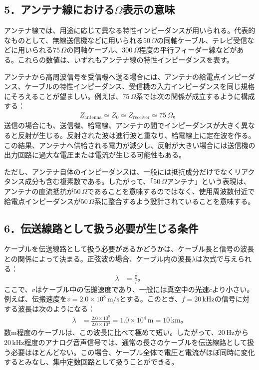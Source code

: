 \documentclass[platex,dvipdfmx,a4paper]{jsarticle}
\begin{document}
\subsection*{5．アンテナ線における$\Omega$表示の意味}

アンテナ線では、用途に応じて異なる特性インピーダンスが用いられる。代表的なものとして、無線送信機などに用いられる$50\,\Omega$の同軸ケーブル、テレビ受信などに用いられる$75\,\Omega$の同軸ケーブル、$300\,\Omega$程度の平行フィーダー線などがある。これらの数値は、いずれもアンテナ線の特性インピーダンスを表す。

アンテナから高周波信号を受信機へ送る場合には、アンテナの給電点インピーダンス、ケーブルの特性インピーダンス、受信機の入力インピーダンスを同じ規格にそろえることが望ましい。例えば、$75\,\Omega$系では次の関係が成立するように構成する：
\begin{align*}
  Z_{\mathrm{antenna}}
  \simeq Z_0
  \simeq Z_{\mathrm{receiver}}
  \simeq75\,\Omega。
\end{align*}
送信の場合にも、送信機、給電線、アンテナの間でインピーダンスが大きく異なると反射が生じる。反射された波は進行波と重なり、給電線上に定在波を作る。この結果、アンテナへ供給される電力が減少し、反射が大きい場合には送信機の出力回路に過大な電圧または電流が生じる可能性もある。

ただし、アンテナ自体のインピーダンスは、一般には抵抗成分だけでなくリアクタンス成分も含む複素数である。したがって、「$50\,\Omega$アンテナ」という表現は、アンテナの直流抵抗が$50\,\Omega$であることを意味するのではなく、使用周波数付近で給電点インピーダンスが$50\,\Omega$系に整合するよう設計されていることを意味する。

\subsection*{6．伝送線路として扱う必要が生じる条件}

ケーブルを伝送線路として扱う必要があるかどうかは、ケーブル長と信号の波長との関係によって決まる。正弦波の場合、ケーブル内の波長$\lambda$は次式で与えられる：
\begin{align*}
  \lambda
  &=\frac{v}{f}。
\end{align*}
ここで、$v$はケーブル中の伝搬速度であり、一般には真空中の光速$c$より小さい。例えば、伝搬速度を$v=2.0\times10^8\,\mathrm{m/s}$とする。このとき、$f=20\,\mathrm{kHz}$の信号に対する波長は次のようになる：
\begin{align*}
  \lambda
  &=\frac{2.0\times10^8}{2.0\times10^4}
   =1.0\times10^4\,\mathrm{m}
   =10\,\mathrm{km}。
\end{align*}
数$\mathrm{m}$程度のケーブルは、この波長に比べて極めて短い。したがって、$20\,\mathrm{Hz}$から$20\,\mathrm{kHz}$程度のアナログ音声信号では、通常の長さのケーブルを伝送線路として扱う必要はほとんどない。この場合、ケーブル全体で電圧と電流がほぼ同時に変化するとみなし、集中定数回路として扱うことができる。
\end{document}
